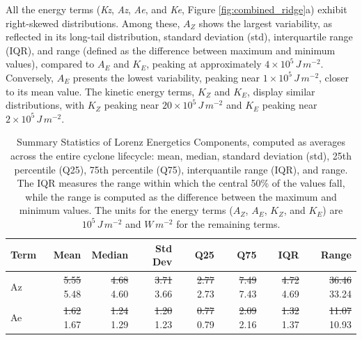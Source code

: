 \documentclass[pdflatex,sn-chicago]{sn-jnl}%
\makeatletter
\theoremstyle{plain}
\theoremstyle{definition}
\theoremstyle{remark}
\theoremstyle{definition}
\providecommand{\DIFaddtex}[1]{{\protect\color{blue}#1}} %
\providecommand{\DIFdeltex}[1]{{\protect\color{red}\sout{#1}}} %
\providecommand{\DIFaddFL}[1]{\DIFadd{#1}} %
\providecommand{\DIFdelFL}[1]{\DIFdel{#1}} %
\providecommand{\DIFaddbeginFL}{} %
\providecommand{\DIFaddendFL}{} %
\providecommand{\DIFdelbeginFL}{} %
\providecommand{\DIFdelendFL}{} %
\providecommand{\DIFadd}[1]{\texorpdfstring{\DIFaddtex{#1}}{#1}} %
\providecommand{\DIFdel}[1]{\texorpdfstring{\DIFdeltex{#1}}{}} %
\let\sout@orig\sout %
\renewcommand{\sout}[1]{\ifmmode\text{\sout@orig{\ensuremath{#1}}}\else\sout@orig{#1}\fi} %
\makeatother
\begin{document}
All the energy terms (\textit{Kz}, \textit{Az}, \textit{Ae}, and \textit{Ke}, Figure \ref{fig:combined_ridge}a) exhibit right-skewed distributions. Among these, $A_Z$ shows the largest variability, as reflected in its long-tail distribution, standard deviation (std), interquartile range (IQR), and range (defined as the difference between maximum and minimum values), compared to $A_E$ and $K_E$, peaking at approximately $4 \times 10^5 \, J \, m^{-2}$. Conversely, $A_E$ presents the lowest variability, peaking near $1 \times 10^5 \, J \, m^{-2}$, closer to its mean value. The kinetic energy terms, $K_Z$ and $K_E$, display similar distributions, with $K_Z$ peaking near $20 \times 10^5 \, J \, m^{-2}$ and $K_E$ peaking near $2 \times 10^5 \, J \, m^{-2}$.


\begin{table}[!htbp]
\centering
\caption[Summary Statistics of Lorenz Energetics Components]{Summary Statistics of Lorenz Energetics Components, computed as averages across the entire cyclone lifecycle: mean, median, standard deviation (std), 25th percentile (Q25), 75th percentile (Q75), interquantile range (IQR), and range. The IQR measures the range within which the central 50\% of the values fall, while the range is computed as the difference between the maximum and minimum values. The units for the energy terms ($A_Z$, $A_E$, $K_Z$, and $K_E$) are $10^5 \, J \, m^{-2}$ and $W \, m^{-2}$ for the remaining terms.}
\label{tab:lec_stats}
\begin{tabular}{lrrrrrrr}
\toprule
Term & Mean & Median & Std Dev & Q25 & Q75 & IQR & Range \\
\midrule
Az & \DIFdelbeginFL \DIFdelFL{5.55 }\DIFdelendFL \DIFaddbeginFL \DIFaddFL{5.48 }\DIFaddendFL & \DIFdelbeginFL \DIFdelFL{4.68 }\DIFdelendFL \DIFaddbeginFL \DIFaddFL{4.60 }\DIFaddendFL & \DIFdelbeginFL \DIFdelFL{3.71 }\DIFdelendFL \DIFaddbeginFL \DIFaddFL{3.66 }\DIFaddendFL & \DIFdelbeginFL \DIFdelFL{2.77 }\DIFdelendFL \DIFaddbeginFL \DIFaddFL{2.73 }\DIFaddendFL & \DIFdelbeginFL \DIFdelFL{7.49 }\DIFdelendFL \DIFaddbeginFL \DIFaddFL{7.43 }\DIFaddendFL & \DIFdelbeginFL \DIFdelFL{4.72 }\DIFdelendFL \DIFaddbeginFL \DIFaddFL{4.69 }\DIFaddendFL & \DIFdelbeginFL \DIFdelFL{36.46 }\DIFdelendFL \DIFaddbeginFL \DIFaddFL{33.24 }\DIFaddendFL \\
Ae & \DIFdelbeginFL \DIFdelFL{1.62 }\DIFdelendFL \DIFaddbeginFL \DIFaddFL{1.67 }\DIFaddendFL & \DIFdelbeginFL \DIFdelFL{1.24 }\DIFdelendFL \DIFaddbeginFL \DIFaddFL{1.29 }\DIFaddendFL & \DIFdelbeginFL \DIFdelFL{1.20 }\DIFdelendFL \DIFaddbeginFL \DIFaddFL{1.23 }\DIFaddendFL & \DIFdelbeginFL \DIFdelFL{0.77 }\DIFdelendFL \DIFaddbeginFL \DIFaddFL{0.79 }\DIFaddendFL & \DIFdelbeginFL \DIFdelFL{2.09 }\DIFdelendFL \DIFaddbeginFL \DIFaddFL{2.16 }\DIFaddendFL & \DIFdelbeginFL \DIFdelFL{1.32 }\DIFdelendFL \DIFaddbeginFL \DIFaddFL{1.37 }\DIFaddendFL & \DIFdelbeginFL \DIFdelFL{11.07 }\DIFdelendFL \DIFaddbeginFL \DIFaddFL{10.93 }\DIFaddendFL \\

\end{tabular}
\end{table}
\end{document}
